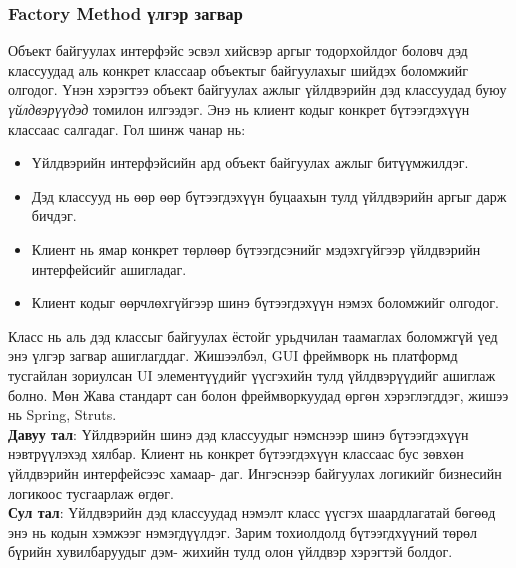 \subsubsection{Factory Method үлгэр загвар}
\quad \quad Объект байгуулах интерфэйс эсвэл хийсвэр аргыг тодорхойлдог боловч дэд классуудад аль конкрет классаар объектыг байгуулахыг шийдэх боломжийг олгодог. Үнэн хэрэгтээ объект байгуулах ажлыг үйлдвэрийн дэд классуудад буюу \textit{үйлдвэрүүдэд} томилон илгээдэг. Энэ нь клиент кодыг конкрет бүтээгдэхүүн классаас салгадаг. Гол шинж чанар нь:
\begin{itemize}
	\item Үйлдвэрийн интерфэйсийн ард объект байгуулах ажлыг битүүмжилдэг.
	\item Дэд классууд нь өөр өөр бүтээгдэхүүн буцаахын тулд үйлдвэрийн аргыг дарж бичдэг.
	\item Клиент нь ямар конкрет төрлөөр бүтээгдсэнийг мэдэхгүйгээр үйлдвэрийн интерфейсийг ашигладаг.
	\item Клиент кодыг өөрчлөхгүйгээр шинэ бүтээгдэхүүн нэмэх боломжийг олгодог.
\end{itemize}
Класс нь аль дэд классыг байгуулах ёстойг урьдчилан таамаглах боломжгүй үед энэ үлгэр загвар ашиглагддаг. Жишээлбэл, GUI фреймворк нь платформд тусгайлан зориулсан UI элементүүдийг үүсгэхийн тулд үйлдвэрүүдийг ашиглаж болно. Мөн Жава стандарт сан болон фреймворкуудад өргөн хэрэглэгддэг, жишээ нь Spring, Struts.\\
\textbf{Давуу тал}: Үйлдвэрийн шинэ дэд классуудыг нэмснээр шинэ бүтээгдэхүүн нэвтрүүлэхэд хялбар. Клиент нь конкрет бүтээгдэхүүн классаас бус зөвхөн үйлдвэрийн интерфейсээс хамаар- даг. Ингэснээр байгуулах логикийг бизнесийн логикоос тусгаарлаж өгдөг.\\
\textbf{Сул тал}: Үйлдвэрийн дэд классуудад нэмэлт класс үүсгэх шаардлагатай бөгөөд энэ нь кодын хэмжээг нэмэгдүүлдэг. Зарим тохиолдолд бүтээгдхүүний төрөл бүрийн хувилбаруудыг дэм- жихийн тулд олон үйлдвэр хэрэгтэй болдог.

